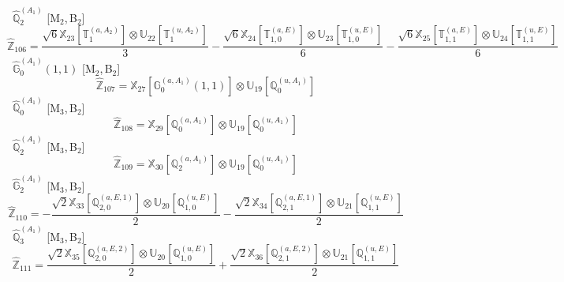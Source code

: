 \documentclass[fleqn,10pt,landscape]{article}
\begin{document}
\begin{itemize}
\begin{dmath*}
\end{dmath*}
\vspace{4mm}
\noindent {} $\,\,\,\hat{\mathbb{Q}}_{2}^{(A_{1})}$ [M$_{2}$,\,B$_{2}$]
\begin{dmath*}
\hat{\mathbb{Z}}_{106}=\frac{\sqrt{6} \mathbb{X}_{23}[\mathbb{T}_{1}^{(a,A_{2})}] \otimes\mathbb{U}_{22}[\mathbb{T}_{1}^{(u,A_{2})}]}{3} - \frac{\sqrt{6} \mathbb{X}_{24}[\mathbb{T}_{1,0}^{(a,E)}] \otimes\mathbb{U}_{23}[\mathbb{T}_{1,0}^{(u,E)}]}{6} - \frac{\sqrt{6} \mathbb{X}_{25}[\mathbb{T}_{1,1}^{(a,E)}] \otimes\mathbb{U}_{24}[\mathbb{T}_{1,1}^{(u,E)}]}{6}
\end{dmath*}
\vspace{4mm}
\noindent {} $\,\,\,\hat{\mathbb{G}}_{0}^{(A_{1})}(1,1)$ [M$_{2}$,\,B$_{2}$]
\begin{dmath*}
\hat{\mathbb{Z}}_{107}=\mathbb{X}_{27}[\mathbb{G}_{0}^{(a,A_{1})}(1,1)] \otimes\mathbb{U}_{19}[\mathbb{Q}_{0}^{(u,A_{1})}]
\end{dmath*}
\vspace{4mm}
\noindent {} $\,\,\,\hat{\mathbb{Q}}_{0}^{(A_{1})}$ [M$_{3}$,\,B$_{2}$]
\begin{dmath*}
\hat{\mathbb{Z}}_{108}=\mathbb{X}_{29}[\mathbb{Q}_{0}^{(a,A_{1})}] \otimes\mathbb{U}_{19}[\mathbb{Q}_{0}^{(u,A_{1})}]
\end{dmath*}
\vspace{4mm}
\noindent {} $\,\,\,\hat{\mathbb{Q}}_{2}^{(A_{1})}$ [M$_{3}$,\,B$_{2}$]
\begin{dmath*}
\hat{\mathbb{Z}}_{109}=\mathbb{X}_{30}[\mathbb{Q}_{2}^{(a,A_{1})}] \otimes\mathbb{U}_{19}[\mathbb{Q}_{0}^{(u,A_{1})}]
\end{dmath*}
\vspace{4mm}
\noindent {} $\,\,\,\hat{\mathbb{G}}_{2}^{(A_{1})}$ [M$_{3}$,\,B$_{2}$]
\begin{dmath*}
\hat{\mathbb{Z}}_{110}=- \frac{\sqrt{2} \mathbb{X}_{33}[\mathbb{Q}_{2,0}^{(a,E,1)}] \otimes\mathbb{U}_{20}[\mathbb{Q}_{1,0}^{(u,E)}]}{2} - \frac{\sqrt{2} \mathbb{X}_{34}[\mathbb{Q}_{2,1}^{(a,E,1)}] \otimes\mathbb{U}_{21}[\mathbb{Q}_{1,1}^{(u,E)}]}{2}
\end{dmath*}
\vspace{4mm}
\noindent {} $\,\,\,\hat{\mathbb{Q}}_{3}^{(A_{1})}$ [M$_{3}$,\,B$_{2}$]
\begin{dmath*}
\hat{\mathbb{Z}}_{111}=\frac{\sqrt{2} \mathbb{X}_{35}[\mathbb{Q}_{2,0}^{(a,E,2)}] \otimes\mathbb{U}_{20}[\mathbb{Q}_{1,0}^{(u,E)}]}{2} + \frac{\sqrt{2} \mathbb{X}_{36}[\mathbb{Q}_{2,1}^{(a,E,2)}] \otimes\mathbb{U}_{21}[\mathbb{Q}_{1,1}^{(u,E)}]}{2}

\end{dmath*}
\end{itemize}
\end{document}
